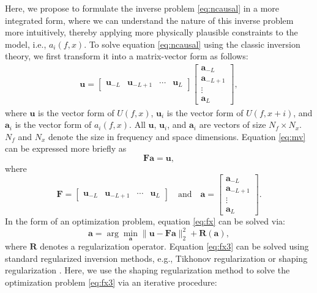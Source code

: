 Here, we propose to formulate the inverse problem \ref{eq:ncausal} in a more integrated form, where we can understand the nature of this inverse problem more intuitively, thereby applying more physically plausible constraints to the model, i.e., $a_i(f,x)$. To solve equation \ref{eq:ncausal} using the classic inversion theory, we first transform it into a matrix-vector form as follows:
\begin{align}
\label{eq:mv}
\mathbf{u} = \left[\begin{array}{cccc}
\mathbf{u}_{-L} &\mathbf{u}_{-L+1}&\cdots&\mathbf{u}_{L}
\end{array}\right]\left[\begin{array}{c}
\mathbf{a}_{-L}\\
\mathbf{a}_{-L+1}\\
\vdots\\
\mathbf{a}_L
\end{array}\right],
\end{align}
where $\mathbf{u}$ is the vector form of $U(f,x)$, $\mathbf{u}_i$ is the vector form of $U(f,x+i)$, and $\mathbf{a}_i$ is the vector form of $a_i(f,x)$. All $\mathbf{u}$, $\mathbf{u}_i$, and $\mathbf{a}_i$ are vectors of size $N_f\times N_x$. $N_f$ and $N_x$ denote the size in frequency and space dimensions. Equation \ref{eq:mv} can be expressed more briefly as
\begin{equation}
\label{eq:fx}
\mathbf{Fa}=\mathbf{u},
\end{equation}
where
\begin{equation}
\label{eq:fx2}
\mathbf{F}=\left[\begin{array}{cccc}
\mathbf{u}_{-L} &\mathbf{u}_{-L+1}&\cdots&\mathbf{u}_{L}
\end{array}\right] \quad \text{and}\quad \mathbf{a}=\left[\begin{array}{c}
\mathbf{a}_{-L}\\
\mathbf{a}_{-L+1}\\
\vdots\\
\mathbf{a}_L
\end{array}\right].
\end{equation}
In the form of an optimization problem, equation \ref{eq:fx} can be solved via:
\begin{equation}
\label{eq:fx3}
\hat{\mathbf{a}} = \arg\min_{\mathbf{a}} \parallel \mathbf{u}-\mathbf{Fa} \parallel_2^2 + \mathbf{R}(\mathbf{a}),
\end{equation}
where $\mathbf{R}$ denotes a regularization operator.  Equation \ref{eq:fx3} can be solved using standard regularized inversion methods, e.g., Tikhonov regularization \cite[]{tikhonov1963} or shaping regularization \cite[]{fomel2007shape}. Here, we use the shaping regularization method to solve the optimization problem \ref{eq:fx3} via an iterative procedure:
